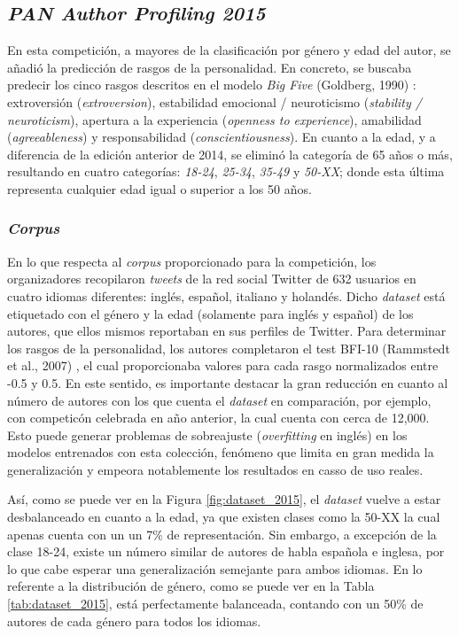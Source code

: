 \subsection{\textit{PAN Author Profiling 2015}}
\label{sec:pan_2015}

En esta competición, a mayores de la clasificación por género y edad del autor, se añadió la predicción de rasgos de la personalidad. En concreto,
se buscaba predecir los cinco rasgos descritos en el modelo \textit{Big Five} (Goldberg, 1990) \cite{goldberg1990alternative}: extroversión (\textit{extroversion}),
estabilidad emocional / neuroticismo (\textit{stability / neuroticism}), apertura a la experiencia (\textit{openness to experience}), amabilidad (\textit{agreeableness}) y
responsabilidad (\textit{conscientiousness}). En cuanto a la edad, y a diferencia de la edición anterior de 2014, se eliminó la categoría de 65 años o más,
resultando en cuatro categorías: \textit{18-24}, \textit{25-34}, \textit{35-49} y \textit{50-XX}; donde esta última representa cualquier edad igual o superior
a los 50 años.

\subsubsection{\textit{Corpus}}
\label{sec:pan_2015_corpus}

\bigskip
En lo que respecta al \textit{corpus} proporcionado para la competición, los organizadores recopilaron \textit{tweets} de la red social Twitter
de 632 usuarios en cuatro idiomas diferentes: inglés, español, italiano y holandés. Dicho \textit{dataset} está etiquetado con el género y la edad
(solamente para inglés y español) de los autores, que ellos mismos reportaban en sus perfiles de Twitter. Para determinar los rasgos de la personalidad,
los autores completaron el test BFI-10 (Rammstedt et al., 2007) \cite{rammstedt2007measuring}, el cual proporcionaba valores para cada rasgo normalizados entre -0.5 y 0.5.
En este sentido, es importante destacar la gran reducción en cuanto al número de autores con los que cuenta el \textit{dataset} en comparación, por ejemplo,
con competicón celebrada en año anterior, la cual cuenta con cerca de 12,000. Esto puede generar problemas de sobreajuste (\textit{overfitting} en inglés) en los modelos
entrenados con esta colección, fenómeno que limita en gran medida la generalización y empeora notablemente los resultados en casso de uso reales.

\bigskip
Así, como se puede ver en la Figura \ref{fig:dataset_2015}, el \textit{dataset} vuelve a estar desbalanceado en cuanto a la edad, ya que existen
clases como la 50-XX la cual apenas cuenta con un un 7\% de representación. Sin embargo,
a excepción de la clase 18-24, existe un número similar de autores de habla española e inglesa, por lo que cabe esperar una generalización
semejante para ambos idiomas. En lo referente a la distribución de género, como se puede ver en la Tabla \ref{tab:dataset_2015}, está perfectamente balanceada,
contando con un 50\% de autores de cada género para todos los idiomas.


